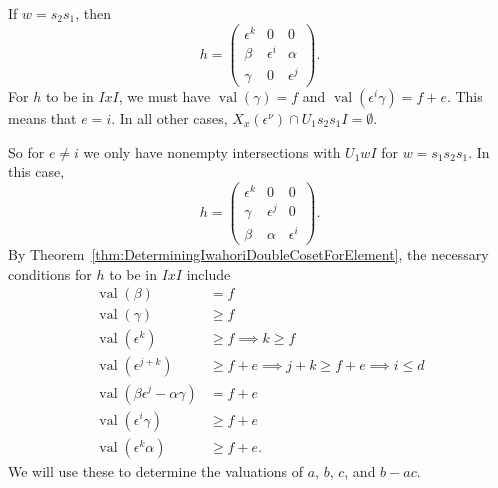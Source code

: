 \documentclass{amsart}
\theoremstyle{definition}
\def\e{\epsilon}
\def\val{\mathop{\mathrm{val}}}
\def\en{\e^{\nu}}
\def\X{X_x(\en)}
\begin{document}
  If $w = s_2s_1$, then
  \begin{equation*}
    h = \begin{pmatrix}
      \e^k & 0 & 0 \\
      \beta & \e^i & \alpha \\
      \gamma & 0 & \e^j
    \end{pmatrix}.
  \end{equation*}
  For $h$ to be in $IxI$, we must have $\val(\gamma) = f$ and $\val(\e^i\gamma)
  = f + e$.  This means that $e = i$.  In all other cases, $\X \cap U_1 s_2 s_1
  I = \emptyset$.

  So for $e \ne i$ we only have nonempty intersections with $U_1 wI$
  for $w = s_1s_2s_1$.  In this case, \begin{equation*}
    h = \begin{pmatrix}
      \e^k & 0 & 0 \\
      \gamma & \e^j & 0 \\
      \beta & \alpha & \e^i
    \end{pmatrix}.
  \end{equation*}
  By Theorem~\ref{thm:DeterminingIwahoriDoubleCosetForElement}, the necessary
  conditions for $h$ to be in $IxI$ include
  \begin{align}
    \label{eq:2-d-max-f-min-id-val-beta}
    \val(\beta) &= f \\
    \label{eq:2-d-max-f-min-id-val-gamma}
    \val(\gamma) &\ge f \\
    \label{eq:2-d-max-f-min-id-k-greater-f}
    \val(\e^k) &\ge f \implies k \ge f \\
    \label{eq:2-d-max-f-min-id-i-less-d}
    \val(\e^{j+k}) &\ge f + e \implies j + k \ge f + e \implies i \le d \\
    \label{eq:2-d-max-f-min-id-val-minor}
    \val(\beta\e^j - \alpha\gamma) &= f + e \\
    \label{eq:2-d-max-f-min-id-val-gamma2}
    \val(\e^i \gamma) &\ge f + e \\
    \label{eq:2-d-max-f-min-id-val-alpha}
    \val(\e^k\alpha) &\ge f + e.
  \end{align}
  We will use these to determine the valuations of $a$, $b$, $c$, and $b-ac$.
\end{document}
